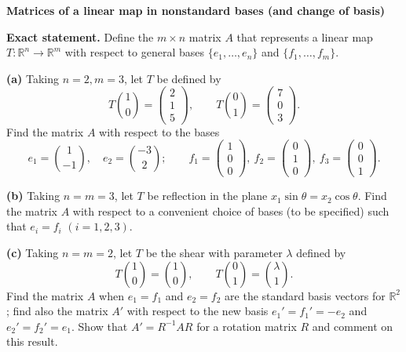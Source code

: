 \begin{problem}[CP-I-0037]
\label{prob:cp-i-0037}
\textbf{Matrices of a linear map in nonstandard bases (and change of basis)}

\textbf{Exact statement.}
\hspace*{1.5em}Define the $m\times n$ matrix $A$ that represents a linear map $T:\mathbb R^n\to\mathbb R^m$ with respect to general bases
$\{e_1,\dots,e_n\}$ and $\{f_1,\dots,f_m\}$.

\textbf{(a)} Taking $n=2,m=3$, let $T$ be defined by
\[
T\binom10=\begin{pmatrix}2\\1\\5\end{pmatrix},\qquad
T\binom01=\begin{pmatrix}7\\0\\3\end{pmatrix}.
\]
Find the matrix $A$ with respect to the bases
\[
e_1=\binom{1}{-1},\quad e_2=\binom{-3}{2};\qquad
f_1=\begin{pmatrix}1\\0\\0\end{pmatrix},\
f_2=\begin{pmatrix}0\\1\\0\end{pmatrix},\
f_3=\begin{pmatrix}0\\0\\1\end{pmatrix}.
\]

\textbf{(b)} Taking $n=m=3$, let $T$ be reflection in the plane $x_1\sin\theta=x_2\cos\theta$.
Find the matrix $A$ with respect to a convenient choice of bases (to be specified) such that $e_i=f_i$ $(i=1,2,3)$.

\textbf{(c)} Taking $n=m=2$, let $T$ be the shear with parameter $\lambda$ defined by
\[
T\binom10=\binom10,\qquad T\binom01=\binom{\lambda}{1}.
\]
Find the matrix $A$ when $e_1=f_1$ and $e_2=f_2$ are the standard basis vectors for $\mathbb R^2$; find also the matrix $A'$
with respect to the new basis $e_1'=f_1'=-e_2$ and $e_2'=f_2'=e_1$.
Show that $A'=R^{-1}AR$ for a rotation matrix $R$ and comment on this result.

\end{problem}

